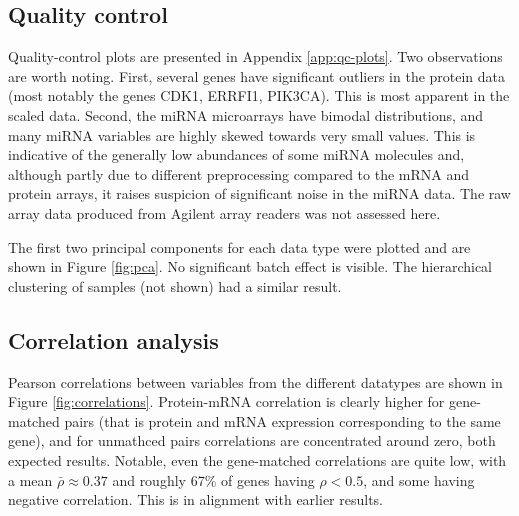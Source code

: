 \subsection{Quality control}

Quality-control plots are presented in Appendix \ref{app:qc-plots}. Two
observations are worth noting. First, several genes have significant outliers
in the protein data (most notably the genes CDK1, ERRFI1, PIK3CA). This is
most apparent in the scaled data. Second, the miRNA microarrays have bimodal
distributions, and many miRNA variables are highly skewed towards very small
values. This is indicative of the generally low abundances of some miRNA molecules
and, although partly due to different preprocessing compared to the mRNA and
protein arrays, it raises suspicion of significant noise in the miRNA data.
The raw array data produced from Agilent array readers was not assessed here.

The first two principal components for each data type were plotted and are
shown in Figure \ref{fig:pca}. No significant batch effect is visible. The
hierarchical clustering of samples (not shown) had a similar result.


\subsection{Correlation analysis}

Pearson correlations between variables from the different datatypes are shown in Figure
\ref{fig:correlations}. Protein-mRNA correlation is clearly higher for gene-matched pairs
(that is protein and mRNA expression corresponding to the same gene), and for
unmathced pairs correlations are concentrated around zero, both expected
results. Notable, even the gene-matched correlations are quite low, with a
mean $\bar{\rho} \approx 0.37$ and roughly 67\% of genes having $\rho < 0.5$, and
some having negative correlation. This is in alignment with earlier results. 

